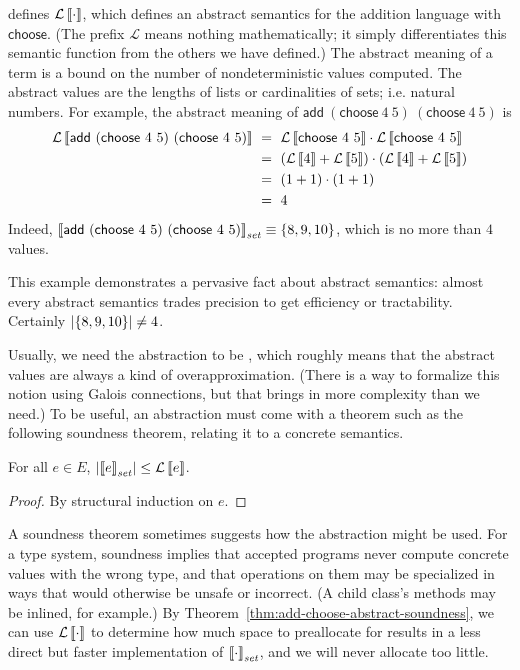 { defines $\mathcal{L}\left\llbracket{\cdot}\right\rrbracket$, which defines an abstract semantics for the addition language with $\mathsf{choose}$.
(The prefix $\mathcal{L}$ means nothing mathematically; it simply differentiates this semantic function from the others we have defined.)
The abstract meaning of a term is a bound on the number of nondeterministic values computed.
The abstract values are the lengths of lists or cardinalities of sets; i.e. natural numbers.
For example, the abstract meaning of $\mathsf{add}~(\mathsf{choose}~4~5)~(\mathsf{choose}~4~5)$ is
\begin{equation}
\begin{aligned}
	\mathcal{L}\left\llbracket{\mathsf{add}~(\mathsf{choose}~4~5)~(\mathsf{choose}~4~5)}\right\rrbracket
	&\ =\ \mathcal{L}\left\llbracket{\mathsf{choose}~4~5}\right\rrbracket \cdot \mathcal{L}\left\llbracket{\mathsf{choose}~4~5}\right\rrbracket
\\
	&\ =\ (\mathcal{L}\left\llbracket{4}\right\rrbracket + \mathcal{L}\left\llbracket{5}\right\rrbracket) \cdot (\mathcal{L}\left\llbracket{4}\right\rrbracket + \mathcal{L}\left\llbracket{5}\right\rrbracket)
\\
	&\ =\ (1 + 1) \cdot (1 + 1)
\\
	&\ =\ 4
\end{aligned}
\end{equation}
Indeed, $\left\llbracket{\mathsf{add}~(\mathsf{choose}~4~5)~(\mathsf{choose}~4~5)}\right\rrbracket_\mathit{set} \equiv \{{8,9,10}\}$, which is no more than $4$ values.

This example demonstrates a pervasive fact about abstract semantics: almost every abstract semantics trades precision to get efficiency or tractability.
Certainly $\left|\{{8,9,10}\}\right| \neq 4$.

Usually, we need the abstraction to be , which roughly means that the abstract values are always a kind of overapproximation.
(There is a way to formalize this notion using Galois connections, but that brings in more complexity than we need.)
To be useful, an abstraction must come with a theorem such as the following soundness theorem, relating it to a concrete semantics.

\begin{theorem}
\label{thm:add-choose-abstract-soundness}
For all $e \in E$, $\left|\left\llbracket{e}\right\rrbracket_\mathit{set}\right| \leq \mathcal{L}\left\llbracket{e}\right\rrbracket$.
\end{theorem}
\begin{proof}
By structural induction on $e$.
\end{proof}

A soundness theorem sometimes suggests how the abstraction might be used.
For a type system, soundness implies that accepted programs never compute concrete values with the wrong type, and that operations on them may be specialized in ways that would otherwise be unsafe or incorrect.
(A child class's methods may be inlined, for example.)
By Theorem~\ref{thm:add-choose-abstract-soundness}, we can use $\mathcal{L}\left\llbracket{\cdot}\right\rrbracket$ to determine how much space to preallocate for results in a less direct but faster implementation of $\left\llbracket{\cdot}\right\rrbracket_\mathit{set}$, and we will never allocate too little.

}
